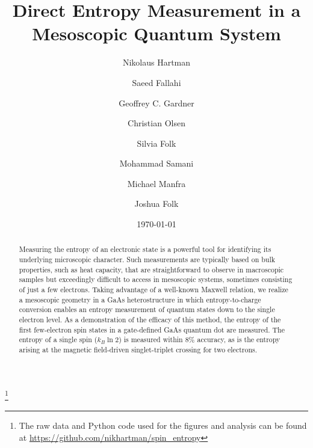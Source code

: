 \documentclass[twocolumn,showpacs,preprintnumbers,amsmath,amssymb,pra,aps,superscriptaddress]{revtex4-1}
\begin{document}
\title{Direct Entropy Measurement in a Mesoscopic Quantum System}
\author{Nikolaus Hartman}
\thanks{The raw data and Python code used for the figures and analysis can be found at \url{https://github.com/nikhartman/spin_entropy}}
\author{Saeed Fallahi}
\author{Geoffrey C. Gardner}
\author{Christian Olsen}
\author{Silvia Folk}
\author{Mohammad Samani}
\author{Michael Manfra}
\author{Joshua Folk}
\date{\today}

\begin{abstract}

Measuring the entropy of an electronic state is a powerful tool for identifying its underlying microscopic character.  Such measurements are typically based on bulk properties, such as heat capacity, that are straightforward to observe in macroscopic samples but exceedingly difficult to access in mesoscopic systems, sometimes consisting of just a few electrons. Taking advantage of a well-known Maxwell relation, we realize a mesoscopic geometry in a GaAs heterostructure in which entropy-to-charge conversion enables an entropy measurement of quantum states down to the single electron level. As a demonstration of the efficacy of this method, the entropy of the first few-electron spin states in a gate-defined GaAs quantum dot are measured. The entropy of a single spin ($k_B \ln{2}$) is measured within 8\% accuracy, as is the entropy arising at the magnetic field-driven singlet-triplet crossing for two electrons.

\end{abstract}

\maketitle
\end{document}
